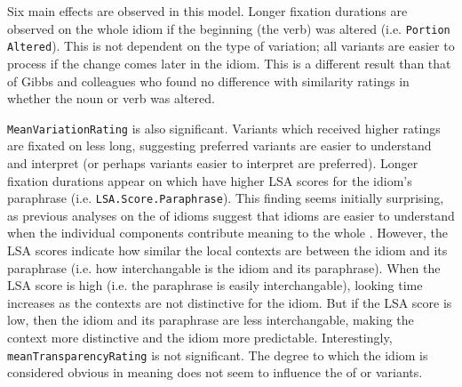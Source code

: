 \documentclass[output=paper
,modfonts
,nonflat]{langsci/langscibook}
\begin{document}



Six main effects are observed in this model. Longer fixation durations are observed on the whole idiom  if the beginning (the verb) was altered (i.e. \texttt{Portion Altered}). This is not dependent on the type of variation; all variants are easier to process  if the change comes later in the idiom. This is a different result than that of Gibbs and colleagues \citep{GibbsEtAl1989, GibbsNayak1989} who found no difference with similarity ratings in whether the noun or verb was altered. %

\texttt{MeanVariationRating} is also significant. Variants which received higher  ratings are fixated on less long, suggesting preferred variants  are easier to understand and interpret (or perhaps variants easier to interpret are preferred). Longer fixation durations appear on  which have higher LSA scores for the idiom's paraphrase (i.e. \texttt{LSA.Score.Paraphrase}). This finding seems initially surprising, as previous analyses on the  of idioms suggest that idioms are easier to understand when the individual components contribute meaning  to the whole \citep{GibbsEtAl1989}. However, the LSA scores indicate how similar the local contexts are between the idiom and its paraphrase (i.e. how interchangable is the idiom and its paraphrase). When the LSA score is high (i.e. the paraphrase is easily interchangable), looking time increases as the contexts are not distinctive for the idiom. But if the LSA score is low, then the idiom and its paraphrase are less interchangable, making the context more distinctive and the idiom more predictable.  Interestingly, \texttt{meanTransparencyRating} is not significant. The degree to which the idiom is considered obvious in meaning does not seem to influence the  of  or variants. %
\end{document}
